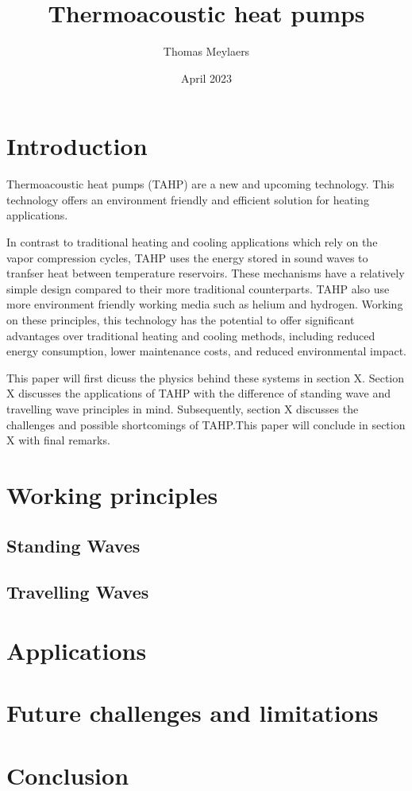 \documentclass{article}
\title{Thermoacoustic heat pumps}
\author{Thomas Meylaers}
\date{April 2023}
\newcommand{\newpara}
    {
      \bigbreak{}
      \noindent
    }
\begin{document}
\maketitle

\newpage

\begin{abstract}

\end{abstract}

\newpage

\tableofcontents

\newpage


\section{Introduction}
Thermoacoustic heat pumps (TAHP) are a new and upcoming technology. This technology offers an environment friendly and efficient solution for heating applications.
\newpara{}
In contrast to traditional heating and cooling applications which rely on the vapor compression cycles, TAHP uses the energy stored in sound waves to tranfser heat between temperature reservoirs. These mechanisms have a relatively simple design compared to their more traditional counterparts. TAHP also use more environment friendly working media such as helium and hydrogen.
Working on these principles, this technology has the potential to offer significant advantages over traditional heating and cooling methods, including reduced energy consumption, lower maintenance costs, and reduced environmental impact.
\newpara{}
This paper will first dicuss the physics behind these systems in section X. Section X discusses the applications of TAHP with the difference of standing wave and travelling wave principles in mind. Subsequently, section X discusses the challenges and possible shortcomings of TAHP.\@ This paper will conclude in section X with final remarks.

\section{Working principles}
\subsection{Standing Waves}
\subsection{Travelling Waves}

\section{Applications}

\section{Future challenges and limitations}

\section{Conclusion}
\end{document}
